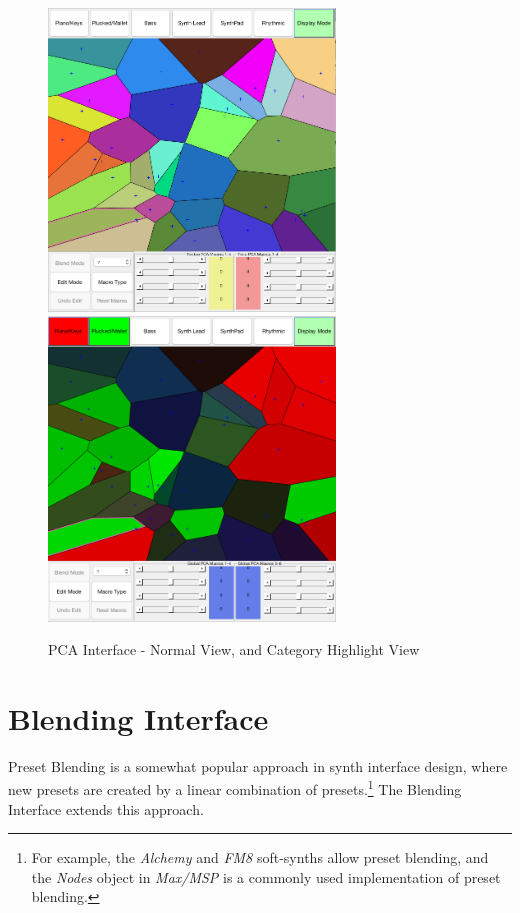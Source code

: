 \documentclass[11pt, oneside]{report}   	%
\begin{document}
\begin{figure}[h] 
	\centering
	\hspace*{-0.2cm}
	\includegraphics[width = 3.0in]{PCAInterface1.png}
	\hspace*{0.1cm}
	\includegraphics[width = 3.0in]{PCAInterface2.png}
	\caption{PCA Interface - Normal View, and Category Highlight View}
	\label{fig:PCAInterface}
\end{figure}

\section{Blending Interface}
Preset Blending is a somewhat popular approach in synth interface design, where new presets are created by a linear combination of presets.\footnote{For example, the \emph{Alchemy} and \emph{FM8} soft-synths allow preset blending, and the  \emph{Nodes} object in \emph{Max/MSP} is a commonly used implementation of preset blending.} The Blending Interface extends this approach.
\end{document}
